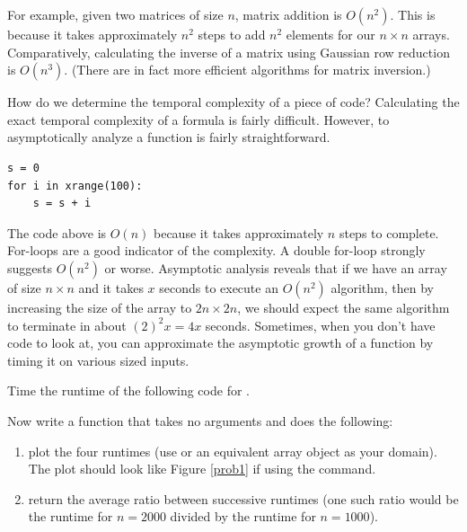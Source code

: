 For example, given two matrices of size $n$, matrix addition is $O(n^2)$. This is because it takes approximately $n^2$ steps to add $n^2$ elements for our $n \times n$ arrays. 
Comparatively, calculating the inverse of a matrix using Gaussian
row reduction is $O(n^3)$. (There are in fact more efficient
algorithms for matrix inversion.)

How do we determine the temporal complexity of a piece of code?
Calculating the exact temporal complexity of a formula is fairly difficult.
However, to asymptotically analyze a function is fairly straightforward.

\begin{lstlisting}
s = 0
for i in xrange(100):
    s = s + i
\end{lstlisting}

The code above is $O(n)$ because it takes approximately $n$ steps to complete. For-loops are a good indicator of the complexity.  A double for-loop strongly suggests $O(n^2)$ or worse.  Asymptotic analysis reveals that
if we have an array of size $n \times n$ and it takes $x$ seconds to execute an $O(n^2)$ algorithm,
then by increasing the size of the array to $2n \times 2n$, we should expect the same algorithm
to terminate in about $(2)^2 x = 4x$ seconds.  Sometimes, when you don't have code to look at,
you can approximate the asymptotic growth of a function by timing it on various sized inputs.

\begin{problem}
Time the runtime of the following code for .



Now write a function that takes no arguments and does the following: 
\begin{enumerate}
\item plot the four runtimes (use \li{[1000, 2000, 4000, 8000]} or an equivalent array object as your domain).
The plot should look like Figure \ref{prob1} if using the  command. 
\item return the average ratio between successive runtimes (one such ratio would be the runtime for $n = 2000$ divided by the runtime for $n = 1000$).
\end{enumerate}
\end{problem}

